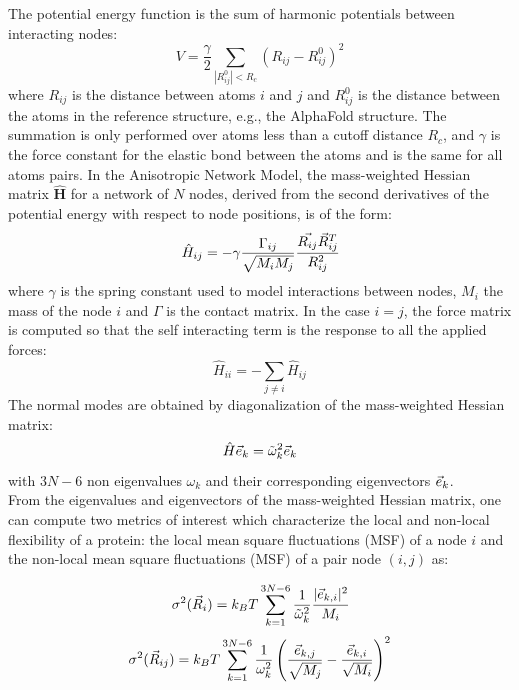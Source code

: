 The potential energy function is the sum of harmonic potentials between interacting nodes:
\begin{equation}
	V=\dfrac{\gamma}{2}\sum_{|R_{ij}^0|<R_c}(R_{ij}-R_{ij}^0)^2
\end{equation}
where $R_{ij}$ is the distance between atoms $i$ and $j$ and $R_{ij}^0$ is the distance between the atoms in the reference structure, e.g., the AlphaFold structure. The summation is only performed over atoms less than a cutoff distance $R_c$, and $\gamma$ is the force constant for the elastic bond between the atoms and is the same for all atoms pairs. In the Anisotropic Network Model, the mass-weighted Hessian matrix $\mathbf{\widehat{H}}$ for a network of $N$ nodes, derived from the second derivatives of the potential energy with respect to node positions, is of the form:
\begin{equation}
	\label{mass-weighted hessian matrix}
	\hat{H}_{ij} = -\gamma\dfrac{\Gamma_{ij}}{\sqrt{M_iM_j}}\cfrac{\vec{R_{ij}}\vec{R}_ {ij}^T}{R^2_ {ij}}
\end{equation}
where $\gamma$ is the spring constant used to model interactions between nodes, $M_i$ the mass of the node $i$ and $\Gamma$ is the contact matrix. In the case $i = j$, the force matrix is computed so that the self interacting term is the response to all the applied forces:
\begin{equation}
	\label{self interacting terms}
	\hat{H}_{ii} = -\sum_{j \ne i}\hat{H}_{ij}
\end{equation}
The normal modes are obtained by diagonalization of the mass-weighted Hessian matrix:
\begin{equation}
	\label{eigen equation}
	\hat{H}\vec{e}_k = \tilde{\omega}_k^2\vec{e}_k
\end{equation}
with $3N-6$ non eigenvalues $\omega_k$ and their corresponding eigenvectors $\vec{e}_k$.\\

From the eigenvalues and eigenvectors of the mass-weighted Hessian matrix, one can compute two metrics of interest which characterize the local and non-local flexibility of a protein: the local mean square fluctuations (MSF) of a node $i$ and the non-local mean square fluctuations (MSF) of a pair node $(i,j)$ as:

\begin{equation}
	\label{thermal B-factors}
	\sigma^2(\vec{R}_i) = k_BT\sum_{k=1}^{3N-6}\frac{1}{\tilde{\omega}_k^2} \cfrac{\vert\vec{e}_{k, i}\vert^2}{M_i}
\end{equation}
\begin{equation}
	\label{metric dij}
	\sigma^2 (\vec{R}_{ij}) = k_BT\sum_{k=1}^{3N-6} \frac{1}{\omega_k^2}\left( \frac{\vec{e}_{k, j}}{\sqrt{M_j}} - \frac{\vec{e}_{k, i}}{\sqrt{M_i}} \right)^2
\end{equation}

